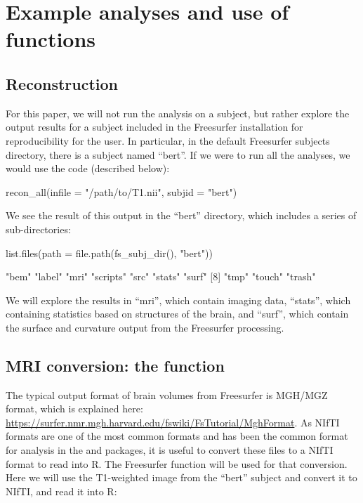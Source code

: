 \section{Example analyses and use of
functions}\label{example-analyses-and-use-of-functions}

\subsection{Reconstruction}\label{reconstruction}

For this paper, we will not run the analysis on a subject, but rather
explore the output results for a subject included in the Freesurfer
installation for reproducibility for the user. In particular, in the
default Freesurfer subjects directory, there is a subject named
``bert''. If we were to run all the analyses, we would use the
 code (described below):

\begin{Schunk}
\begin{Sinput}
recon_all(infile = "/path/to/T1.nii", subjid = "bert")
\end{Sinput}
\end{Schunk}

We see the result of this output in the ``bert'' directory, which
includes a series of sub-directories:

\begin{Schunk}
\begin{Sinput}
list.files(path  = file.path(fs_subj_dir(), "bert"))
\end{Sinput}
\begin{Soutput}
 [1] "bem"     "label"   "mri"     "scripts" "src"     "stats"   "surf"   
 [8] "tmp"     "touch"   "trash"  
\end{Soutput}
\end{Schunk}

We will explore the results in ``mri'', which contain imaging data,
``stats'', which containing statistics based on structures of the brain,
and ``surf'', which contain the surface and curvature output from the
Freesurfer processing.

\subsection{\texorpdfstring{MRI conversion: the 
function}{MRI conversion: the  function}}\label{mri-conversion-the-function}

The typical output format of brain volumes from Freesurfer is MGH/MGZ
format, which is explained here:
\url{https://surfer.nmr.mgh.harvard.edu/fswiki/FsTutorial/MghFormat}. As
NIfTI formats are one of the most common formats and has been the common
format for analysis in the  and 
packages, it is useful to convert these files to a NIfTI format to read
into R. The  Freesurfer function will be used for
that conversion. Here we will use the T1-weighted image from the
``bert'' subject and convert it to NIfTI, and read it into R:

